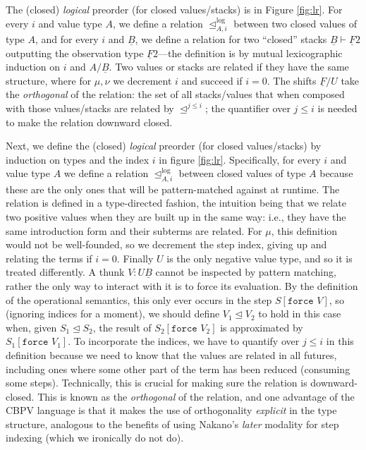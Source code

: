 \documentclass[acmsmall,screen,12pt]{acmart}
\renewcommand{\u}{\underline}
\newcommand{\apreorder}{\trianglelefteq}
\newcommand{\itylrof}[3]{\ilrof{#1}{#3,#2}}
\newcommand{\ilrof}[2]{\mathrel{{#1}^{\text{log}}_{#2}}}
\newcommand{\kw}[1]{\texttt{#1}\,\,}
\newcommand{\force}{\kw{force}}
\begin{document}
{\begin{shortonly}
The (closed) \emph{logical} preorder (for closed values/stacks) is in Figure
\ref{fig:lr}.  For every $i$ and value type $A$, we define a relation
$\itylrof \apreorder i A$ between two closed values of type $A$, and for
every $i$ and $\u B$, we define a relation for two ``closed'' stacks $\u
B \vdash \u F 2$ outputting the observation type $\u F 2$---the
definition is by mutual lexicographic induction on $i$ and $A/\u B$.
Two values or stacks are related if they have the same structure, where
for $\mu,\nu$ we decrement $i$ and succeed if $i = 0$.  The shifts $\u
F/U$ take the \emph{orthogonal} of the relation: the set of all
stacks/values that when composed with those values/stacks are related by
$\apreorder^{j \le i}$; the quantifier over $j \leq i$ is needed to make the
relation downward closed.
\end{shortonly}

\begin{longonly}
Next, we define the (closed) \emph{logical} preorder (for closed values/stacks) by induction on types and
the index $i$ in figure \ref{fig:lr}.
%
Specifically, for every $i$ and value type $A$ we define a relation
$\itylrof \apreorder i A$ between closed values of type $A$ because
these are the only ones that will be pattern-matched against at
runtime.
%
The relation is defined in a type-directed fashion, the intuition being
that we relate two positive values when they are built up in the same
way: i.e., they have the same introduction form and their subterms are
related.
%
For $\mu$, this definition would not be well-founded, so we decrement
the step index, giving up and relating the terms if $i = 0$.
%
Finally $U$ is the only negative value type, and so it is treated
differently.
%
A thunk $V : U\u B$ cannot be inspected by pattern matching, rather
the only way to interact with it is to force its evaluation.
%
By the definition of the operational semantics, this only ever occurs
in the step $S[\force V]$, so (ignoring indices for a moment), we
should define $V_1 \apreorder V_2$ to hold in this case when, given
$S_1 \apreorder S_2$, the result of $S_2[\force V_2]$ is approximated
by $S_1[\force V_1]$.
%
To incorporate the indices, we have to quantify over $j \leq i$ in
this definition because we need to know that the values are related in
all futures, including ones where some other part of the term has been
reduced (consuming some steps).
%
Technically, this is crucial for making sure the relation is
downward-closed.
%
This is known as the \emph{orthogonal} of the relation, and one
advantage of the CBPV language is that it makes the use of
orthogonality \emph{explicit} in the type structure, analogous to the
benefits of using Nakano's \emph{later} modality \cite{nakano} for step indexing
(which we ironically do not do).


\end{longonly}}
\end{document}
